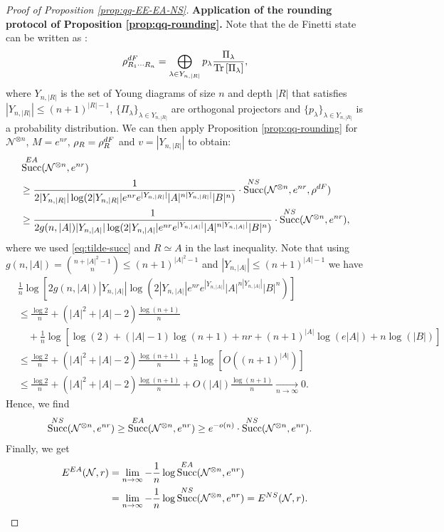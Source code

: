 \documentclass[a4paper,onecolumn,11pt,accepted=2025-10-01]{quantumarticle}
\DeclareMathOperator{\suc}{Succ}
\newcommand*{\cN}{\mathcal{N}}
\newcommand*{\tr}[1]{\mathrm{Tr}\left[#1\right]}
\begin{document}
\begin{proof}[Proof of Proposition \ref{prop:qq-EE-EA-NS}]
\textbf{Application of the rounding protocol of Proposition \ref{prop:qq-rounding}. } 
Note that the de Finetti state can be written as \cite[Lemma 1]{Hayashi2016Oct}:
\begin{align}\label{eq:definetti}
    \rho^{\rm{dF}}_{R_1\cdots R_n} = \bigoplus_{\lambda\in Y_{n,|R|}} p_{\lambda} \frac{\Pi_{\lambda}}{\tr{\Pi_{\lambda}}},
\end{align}
where $Y_{n,|R|}$ is the set of Young diagrams of size $n$ and depth $|R|$ that satisfies $|Y_{n,|R|}|\le (n+1)^{|R|-1}$, $\{\Pi_{\lambda}\}_{\lambda\in Y_{n,|R|}}$ are orthogonal projectors and $\{p_{\lambda}\}_{\lambda\in Y_{n,|R|}}$ is a probability distribution. We can then apply Proposition \ref{prop:qq-rounding}  for $\cN^{\otimes n}$, $M=e^{nr}$,  $\rho_R= \rho_R^{\rm{dF}}$ and $v= |Y_{n,|R|}|$ to obtain:
    \begin{align}
         &\suc^{\rm{EA}}(\cN^{\otimes n},e^{nr}) 
         \\&\ge \frac{1}{2|Y_{n,|R|}| \log(2|Y_{n,|R|}| e^{nr} e^{|Y_{n,|R|}|}|A|^{n|Y_{n,|R|}|}|B|^n)}\cdot\suc^{\rm{NS}}(\cN^{\otimes n},e^{nr}, \rho^{\rm{dF}})
         \\&\ge \frac{1}{2g(n,|A|)|Y_{n,|A|}|\log(2|Y_{n,|A|}| e^{nr} e^{|Y_{n,|A|}|}|A|^{n|Y_{n,|A|}|}|B|^n)}\cdot\suc^{\rm{NS}}(\cN^{\otimes n},e^{nr}),
    \end{align}
where we used \eqref{eq:tilde-succ} and $R\simeq A$ in the last inequality. Note that using $g(n,|A|) = \binom{n+|A|^2-1}{n}\le (n+1)^{|A|^2-1}$ and $|Y_{n,|A|}|\le (n+1)^{|A|-1}$ we have 
\begin{align}
    &\frac{1}{n}\log \left[2g(n,|A|)|Y_{n,|A|}|\log\left(2|Y_{n,|A|}| e^{nr}e^{|Y_{n,|A|}|} |A|^{n|Y_{n,|A|}|}|B|^n\right) \right]
    \\&\le  \frac{\log2}{n}+ (|A|^2+|A|-2)\frac{\log(n+1)}{n}
    \\&\quad + \frac{1}{n}\log\left[\log(2)+ (|A|-1)\log(n+1) +nr +(n+1)^{|A|} \log(e|A|) + n \log(|B|) \right] 
    \\&\le  \frac{\log2}{n}+ (|A|^2+|A|-2)\frac{\log(n+1)}{n}+ \frac{1}{n}\log[O((n+1)^{|A|}) ] 
    \\&\le  \frac{\log2}{n}+ (|A|^2+|A|-2)\frac{\log(n+1)}{n}+ O(|A|)\frac{\log(n+1)}{n} 
    \underset{n \rightarrow \infty}{\longrightarrow} 0. 
\end{align}
Hence, we find
\begin{align}
        \suc^{\rm{NS}}(\cN^{\otimes n},e^{nr})\ge  \suc^{\rm{EA}}(\cN^{\otimes n},e^{nr}) &\ge e^{-o(n)}\cdot\suc^{\rm{NS}}(\cN^{\otimes n},e^{nr}).
    \end{align}
Finally, we get
\begin{align}
    E^{\rm{EA}}(\cN, r) &= \lim_{n \rightarrow \infty} - \frac{1}{n}\log\suc^{\rm{EA}}(\cN^{\otimes n},e^{nr})
    \\&= \lim_{n \rightarrow \infty} -\frac{1}{n}\log\suc^{\rm{NS}}(\cN^{\otimes n},e^{nr})=  E^{\rm{NS}}(\cN, r).
\end{align}
\end{proof}
\end{document}
